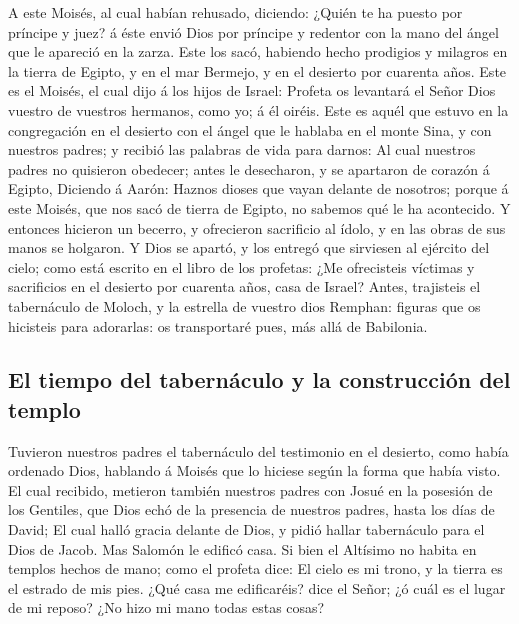  A este Moisés, al cual habían rehusado, diciendo: ¿Quién
te ha puesto por príncipe y juez? á éste envió Dios por príncipe y
redentor con la mano del ángel que le apareció en la zarza.
 Este los sacó, habiendo hecho prodigios y milagros en la
tierra de Egipto, y en el mar Bermejo, y en el desierto por cuarenta
años.  Este es el Moisés, el cual dijo á los hijos de
Israel: Profeta os levantará el Señor Dios vuestro de vuestros hermanos,
como yo; á él oiréis.  Este es aquél que estuvo en la
congregación en el desierto con el ángel que le hablaba en el monte
Sina, y con nuestros padres; y recibió las palabras de vida para darnos:
 Al cual nuestros padres no quisieron obedecer; antes le
desecharon, y se apartaron de corazón á Egipto,  Diciendo á
Aarón: Haznos dioses que vayan delante de nosotros; porque á este
Moisés, que nos sacó de tierra de Egipto, no sabemos qué le ha
acontecido.  Y entonces hicieron un becerro, y ofrecieron
sacrificio al ídolo, y en las obras de sus manos se holgaron.
 Y Dios se apartó, y los entregó que sirviesen al ejército
del cielo; como está escrito en el libro de los profetas: ¿Me
ofrecisteis víctimas y sacrificios en el desierto por cuarenta años,
casa de Israel?  Antes, trajisteis el tabernáculo de
Moloch, y la estrella de vuestro dios Remphan: figuras que os hicisteis
para adorarlas: os transportaré pues, más allá de Babilonia.

\hypertarget{el-tiempo-del-tabernuxe1culo-y-la-construcciuxf3n-del-templo}{%
\subsection{El tiempo del tabernáculo y la construcción del
templo}\label{el-tiempo-del-tabernuxe1culo-y-la-construcciuxf3n-del-templo}}

 Tuvieron nuestros padres el tabernáculo del testimonio en
el desierto, como había ordenado Dios, hablando á Moisés que lo hiciese
según la forma que había visto.  El cual recibido, metieron
también nuestros padres con Josué en la posesión de los Gentiles, que
Dios echó de la presencia de nuestros padres, hasta los días de David;
 El cual halló gracia delante de Dios, y pidió hallar
tabernáculo para el Dios de Jacob.  Mas Salomón le edificó
casa.  Si bien el Altísimo no habita en templos hechos de
mano; como el profeta dice:  El cielo es mi trono, y la
tierra es el estrado de mis pies. ¿Qué casa me edificaréis? dice el
Señor; ¿ó cuál es el lugar de mi reposo?  ¿No hizo mi mano
todas estas cosas?

